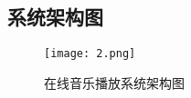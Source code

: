 \documentclass[UTF8,14pt]{article}
\numberwithin{figure}{subsubsection}
\numberwithin{table}{subsubsection}
\begin{document}
\subsection{系统架构图}
\begin{figure}[H]
	\centering
	\texttt{[image: 2.png]}
	\caption{在线音乐播放系统架构图}
\end{figure}
\end{document}
